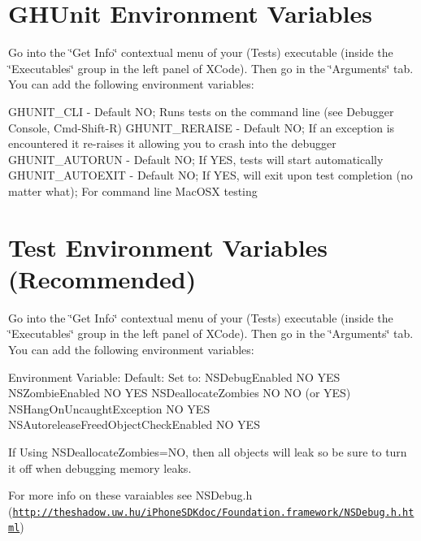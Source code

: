 \hypertarget{_env_variables_GHUnitEnvVariables}{}\section{\-G\-H\-Unit Environment Variables}\label{_env_variables_GHUnitEnvVariables}
\-Go into the \char`\"{}\-Get Info\char`\"{} contextual menu of your (\-Tests) executable (inside the \char`\"{}\-Executables\char`\"{} group in the left panel of \-X\-Code). \-Then go in the \char`\"{}\-Arguments\char`\"{} tab. \-You can add the following environment variables\-:

\begin{DoxyVerb}
 GHUNIT_CLI - Default NO; Runs tests on the command line (see Debugger Console, Cmd-Shift-R)
 GHUNIT_RERAISE - Default NO; If an exception is encountered it re-raises it allowing you to crash into the debugger
 GHUNIT_AUTORUN - Default NO; If YES, tests will start automatically
 GHUNIT_AUTOEXIT - Default NO; If YES, will exit upon test completion (no matter what); For command line MacOSX testing
 \end{DoxyVerb}
\hypertarget{_env_variables_EnvVariablesTest}{}\section{\-Test Environment Variables (\-Recommended)}\label{_env_variables_EnvVariablesTest}
\-Go into the \char`\"{}\-Get Info\char`\"{} contextual menu of your (\-Tests) executable (inside the \char`\"{}\-Executables\char`\"{} group in the left panel of \-X\-Code). \-Then go in the \char`\"{}\-Arguments\char`\"{} tab. \-You can add the following environment variables\-:

\begin{DoxyVerb}
 Environment Variable:                 Default:  Set to:
 NSDebugEnabled                           NO       YES
 NSZombieEnabled                          NO       YES
 NSDeallocateZombies                      NO       NO (or YES)
 NSHangOnUncaughtException                NO       YES
 NSAutoreleaseFreedObjectCheckEnabled     NO       YES
 \end{DoxyVerb}


\-If \-Using \-N\-S\-Deallocate\-Zombies=\-N\-O, then all objects will leak so be sure to turn it off when debugging memory leaks.

\-For more info on these varaiables see \-N\-S\-Debug.\-h (\href{http://theshadow.uw.hu/iPhoneSDKdoc/Foundation.framework/NSDebug.h.html}{\tt http\-://theshadow.\-uw.\-hu/i\-Phone\-S\-D\-Kdoc/\-Foundation.\-framework/\-N\-S\-Debug.\-h.\-html})

